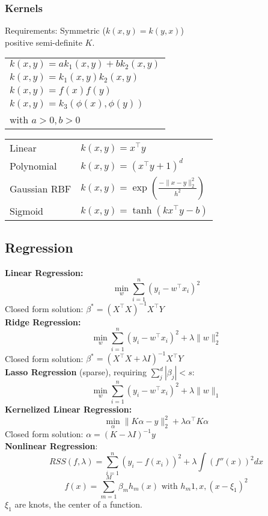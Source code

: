 \documentclass[main]{subfiles}
\begin{document}
\begin{landscape}
\begin{multicols}{4}
{\color{subsubsectionColor}\subsubsection{Kernels}}
Requirements: Symmetric ($k(x,y)=k(y,x)$) \\ positive semi-definite $K$.
\begin{tabular}{l}
\(k(x,y) = a k_1(x,y) + b k_2(x,y)\)\\
\(k(x,y) = k_1(x,y)k_2(x,y)\)\\
\(k(x,y) = f(x) f(y)\)\\
\(k(x,y) = k_3(\phi(x), \phi(y))\) \\
with $a>0,b>0$
\end{tabular}
\begin{tabular}{ll}
Linear & \(k(x,y) = x^\top y\)\\
Polynomial & \(k(x,y) = (x^\top y + 1)^d\)\\
Gaussian RBF & \(k(x,y) = \exp(\frac{-\|x-y\|^2_2}{h^2})\)\\
Sigmoid & \(k(x,y) = \tanh(k x^\top y - b)\)
\end{tabular}

{\color{subsectionColor}\subsection{Regression}}
\textbf{Linear Regression:}
\begin{equation}
\min_{w} \sum_{i=1}^n (y_i - w^\top x_i)^2
\end{equation}
Closed form solution: $\beta^* = (X^\top X)^{-1} X^\top Y$ \\
\textbf{Ridge Regression:}
\begin{equation}
\min_{w} \sum_{i=1}^n (y_i - w^\top x_i)^2 + \lambda \|w\|_2^2
\end{equation}
Closed form solution: $\beta^* = (X^\top X + \lambda I)^{-1} X^\top Y$ \\
\textbf{Lasso Regression} (sparse), requiring $\sum\limits_j^d |\beta_j| < s$:
\begin{equation}
\min_{w} \sum_{i=1}^n (y_i - w^\top x_i)^2 + \lambda \|w\|_1
\end{equation}
\textbf{Kernelized Linear Regression:}
\begin{equation}
\min_{\alpha} \|K\alpha - y \|_2^2 + \lambda \alpha^\top K \alpha
\end{equation}
Closed form solution: $\alpha = (K-\lambda I)^{-1} y $ \\
\textbf{Nonlinear Regression}:
\begin{equation}
RSS(f,\lambda) = \sum\limits_{i=1}^n (y_i - f(x_i))^2 + \lambda  \int (f''(x))^2dx
\end{equation}
\begin{equation}
f(x) = \sum\limits_{m=1}^M \beta_m h_m(x) \text{ with } h_m {1,x,(x-\xi_1)^2}
\end{equation}
$\xi_1$ are knots, the center of a function.


\end{multicols}
\end{landscape}
\end{document}
